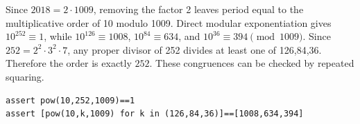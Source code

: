 Since $2018=2\cdot1009$, removing the factor 2 leaves period equal to the multiplicative order of 10 modulo 1009. Direct modular exponentiation gives $10^{252}\equiv1$, while $10^{126}\equiv1008$, $10^{84}\equiv634$, and $10^{36}\equiv394\pmod{1009}$. Since $252=2^2\cdot3^2\cdot7$, any proper divisor of 252 divides at least one of 126,84,36. Therefore the order is exactly $\boxed{252}$. These congruences can be checked by repeated squaring.
\begin{verbatim}
assert pow(10,252,1009)==1
assert [pow(10,k,1009) for k in (126,84,36)]==[1008,634,394]
\end{verbatim}
